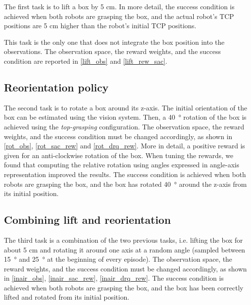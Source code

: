 \documentclass[letterpaper, 10 pt, conference]{ieeeconf}  %
\begin{document}
The first task is to lift a box by 5 cm. In more detail, the success condition is achieved when both robots are grasping the box, and the actual robot's TCP positions are 5 cm higher than the robot's initial TCP positions.

This task is the only one that does not integrate the box position into the observations. The observation space, the reward weights, and the success condition are reported in \cref{lift_obs} and \cref{lift_rew_sac}.

\subsection{Reorientation policy}\label{rot}

The second task is to rotate a box around its z-axis. The initial orientation of the box can be estimated using the vision system. Then, a \SI{40}{\degree} rotation of the box is achieved using the \textit{top-grasping} configuration. 
The observation space, the reward weights, and the success condition must be changed accordingly, as shown in \cref{rot_obs}, \cref{rot_sac_rew} and \cref{rot_drq_rew}. 
More in detail, a positive reward is given for an anti-clockwise rotation of the box. When tuning the rewards, we found that computing the relative rotation using angles expressed in angle-axis representation improved the results. The success condition is achieved when both robots are grasping the box, and the box has rotated \SI{40}{\degree} around the z-axis from its initial position.

\subsection{Combining lift and reorientation}\label{lift+rot}
The third task is a combination of the two previous tasks, i.e. lifting the box for about 5 cm and rotating it around one axis at a random angle (sampled between \SI{15}{\degree} and \SI{25}{\degree} at the beginning of every episode).
The observation space, the reward weights, and the success condition must be changed accordingly, as shown in  \cref{inair_obs}, \cref{inair_sac_rew}, \cref{inair_drq_rew}. 
The success condition is achieved when both robots are grasping the box, and the box has been correctly lifted and rotated from its initial position.
\end{document}
